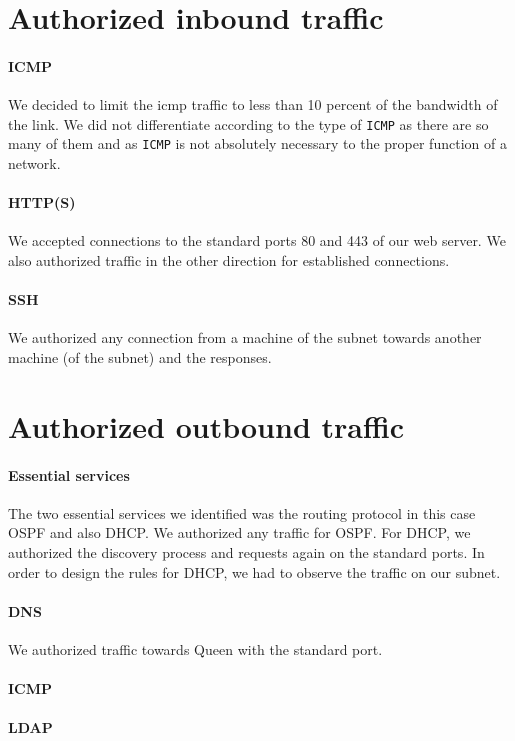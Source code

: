 \documentclass[a4paper,titlepage]{article}
\begin{document}
\section{Authorized inbound traffic}
\paragraph{ICMP} We decided to limit the icmp traffic to less than 10 percent of the bandwidth of the link. We did not differentiate according to the type of \texttt{ICMP} as there are so many of them and as \texttt{ICMP} is not absolutely necessary to the proper function of a network.

\paragraph{HTTP(S)} We accepted connections to the standard ports 80 and 443 of our web server. We also authorized traffic in the other direction for established connections.

\paragraph{SSH} We authorized any connection from a machine of the subnet towards another machine (of the subnet) and the responses.

\section{Authorized outbound traffic}
\paragraph{Essential services} The two essential services we identified was the routing protocol in this case OSPF and also DHCP. We authorized any traffic for OSPF. For DHCP, we authorized the discovery process and requests again on the standard ports. In order to design the rules for DHCP, we had to observe the traffic on our subnet.

\paragraph{DNS} We authorized traffic towards Queen with the standard port.

\paragraph{ICMP}
\paragraph{LDAP}
\end{document}
